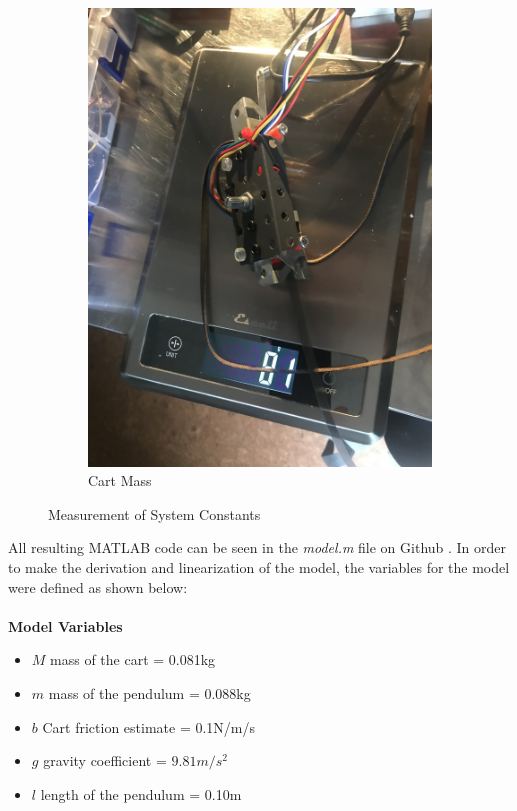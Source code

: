 \documentclass[12pt]{article}
\begin{document}
\begin{figure}[H]
\begin{subfigure}{.49\textwidth}
      \includegraphics[width=1\linewidth]{figures/weigh2.jpg}
      \caption{Cart Mass}
      \label{fig:cMass}
    \end{subfigure}
    \caption{Measurement of System Constants}
    \label{fig:measure}
\end{figure}
All resulting MATLAB code can be seen in the \textit{model.m} file on Github \cite{github}. In order to make the derivation and linearization of the model, the variables for the model were defined as shown below: \\\\
\textbf{Model Variables}
\begin{itemize}
    \item $M$ mass of the cart = 0.081kg
    \item $m$ mass of the pendulum = 0.088kg 
    \item $b$ Cart friction estimate = 0.1N/m/s
    \item $g$ gravity coefficient = $9.81m/s^2$
    \item $l$ length of the pendulum = 0.10m
\end{itemize}
\end{document}

